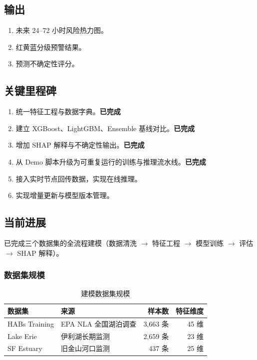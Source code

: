 \documentclass[12pt,a4paper,openany]{ctexrep}
\begin{document}
\subsection{输出}

\begin{enumerate}
\item 未来 24--72 小时风险热力图。
\item 红黄蓝分级预警结果。
\item 预测不确定性评分。
\end{enumerate}

\subsection{关键里程碑}

\begin{enumerate}
\item 统一特征工程与数据字典。\hfill\textcolor{green!60!black}{\textbf{已完成}}
\item 建立 XGBoost、LightGBM、Ensemble 基线对比。\hfill\textcolor{green!60!black}{\textbf{已完成}}
\item 增加 SHAP 解释与不确定性输出。\hfill\textcolor{green!60!black}{\textbf{已完成}}
\item 从 Demo 脚本升级为可重复运行的训练与推理流水线。\hfill\textcolor{green!60!black}{\textbf{已完成}}
\item 接入实时节点回传数据，实现在线推理。
\item 实现增量更新与模型版本管理。
\end{enumerate}

\subsection{当前进展}

已完成三个数据集的全流程建模（数据清洗 $\rightarrow$ 特征工程 $\rightarrow$ 模型训练 $\rightarrow$ 评估 $\rightarrow$ SHAP 解释）。

\subsubsection*{数据集规模}

\begin{table}[htbp]
\centering
\caption{建模数据集规模}
\begin{tabular}{llrr}
\toprule
\textbf{数据集} & \textbf{来源} & \textbf{样本数} & \textbf{特征维度} \\
\midrule
HABs Training & EPA NLA 全国湖泊调查 & 3,663 条 & 45 维 \\
Lake Erie & 伊利湖长期监测 & 2,659 条 & 23 维 \\
SF Estuary & 旧金山河口监测 & 437 条 & 25 维 \\
\bottomrule
\end{tabular}
\end{table}
\end{document}
